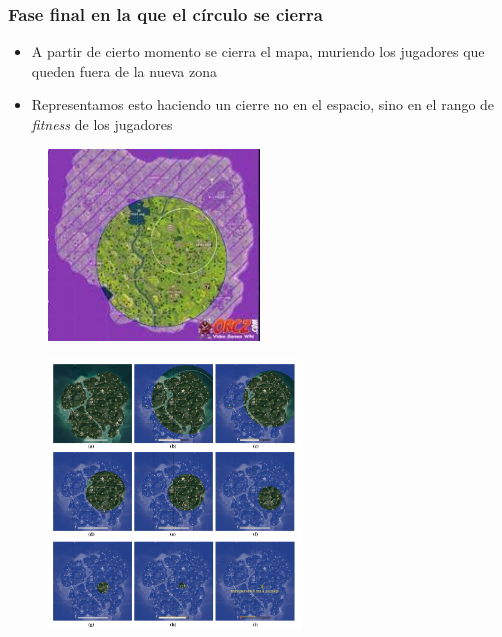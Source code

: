 \documentclass{beamer}
\begin{document}
\begin{frame}
    \frametitle{Fase final en la que el círculo se cierra}

    \begin{itemize}
        \item A partir de cierto momento se cierra el mapa, muriendo los jugadores que queden fuera de la nueva zona
        \item Representamos esto haciendo un cierre no en el espacio, sino en el rango de \emph{fitness} de los jugadores
    \end{itemize}

    \begin{figure}
        \centering
        \includegraphics[width=0.5\textwidth]{circle}
    \end{figure}
\end{frame}

\begin{frame}
    \begin{figure}
        \centering
        \includegraphics[width=0.6\textwidth]{cierre_circulo}
    \end{figure}
\end{frame}
\end{document}
